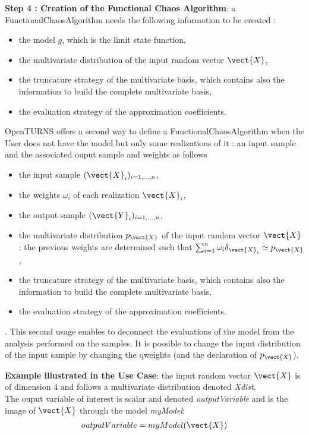 \vspace*{0.1cm}

{\bf Step 4 : Creation of the Functional Chaos Algorithm}: a FunctionalChaosAlgorithm needs the following information to be created :
\begin{itemize}
\item the model $g$, which is the limit state function,
\item the multivariate distribution of the input random vector $\vect{X}$,
\item the truncature strategy of the multivariate basis, which contains also the information to build the complete multivariate basis,
\item the evaluation strategy of the approximation coefficients.
\end{itemize}
OpenTURNS offers a second way to define a FunctionalChaosAlgorithm when the User does not have the model but only some realizations of it : an input sample and the associated ouput sample and weights as follows
\begin{itemize}
\item the input sample $(\vect{X}_i)_{i=1,\dots,n}$,
\item the weights $\omega_i$ of each realization $\vect{X}_i$,
\item the output sample $(\vect{Y}_i)_{i=1,\dots,n}$,
\item the multivariate distribution $p_{\vect{X}}$ of the input random vector $\vect{X}$ : the previous weights are determined such that $\sum_{i=1}^n \omega_i \delta_{\vect{X}_i} \simeq p_{\vect{X}}$ ,
\item the truncature strategy of the multivariate basis, which contains also the information to build the complete multivariate basis,
\item the evaluation strategy of the approximation coefficients.
\end{itemize}.
This second usage enables to deconnect the evaluations of the model from the analysis performed on the samples. It is possible to change the input distribution of the input sample by changing the qweights (and the declaration of   $p_{\vect{X}}$).
\vspace*{0.1cm}

{\bf Example illustrated in the Use Case}: the input random vector $\vect{X}$ is of dimension 4 and follows a multivariate distribution denoted \textit{Xdist}.\\
The ouput variable of interest is scalar and denoted \textit{outputVariable} and is the image of $\vect{X}$ through the model \textit{myModel}:
\begin{align*}
  outputVariable = myModel(\vect{X})
\end{align*}

